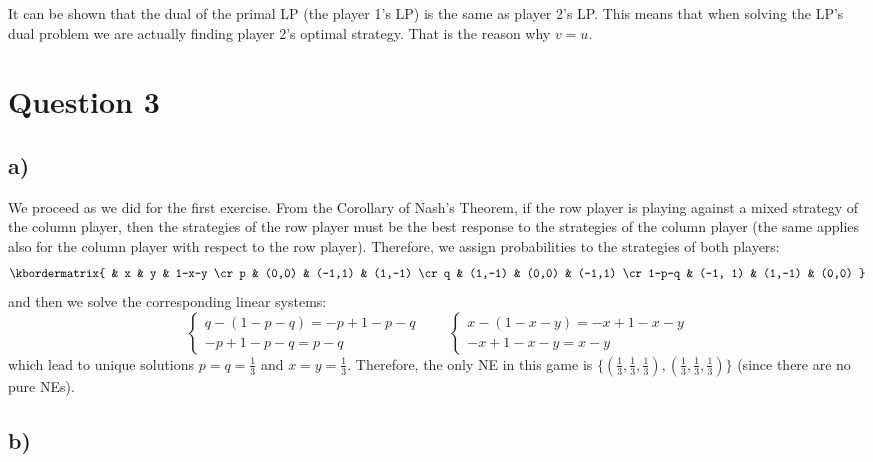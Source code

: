 \documentclass[11pt,a4paper]{article}
\begin{document}
It can be shown that the dual of the primal LP (the player 1's LP) is the same as
player 2's LP. This means that when solving the LP's dual problem we are
actually finding player 2's optimal strategy. That is the reason why $v=u$.
\newpage

\section{Question 3}

\subsection{a)}
We proceed as we did for the first exercise. From the Corollary of Nash's Theorem, if the row player is playing
against a mixed strategy of the column player, then the strategies of the row player must be
the best response to the strategies of the column player (the same applies also for the
column player with respect to the row player). Therefore, we assign probabilities to the strategies of both players:
\begin{equation*}
\kbordermatrix{
& x & y & 1-x-y \cr
p & (0,0) & (-1,1) & (1,-1) \cr
q & (1,-1) & (0,0) & (-1,1) \cr
1-p-q & (-1, 1) & (1,-1) & (0,0)
}
\end{equation*}
and then we solve the corresponding linear systems:
\begin{equation*}
\begin{cases}
q-(1-p-q) = -p +1 -p -q\\
-p +1 -p-q = p-q
\end{cases}
\qquad
\begin{cases}
x-(1-x-y) = -x +1 -x -y\\
-x +1 -x-y = x-y
\end{cases}
\end{equation*}
which lead to unique solutions $p=q=\frac{1}{3}$ and $x=y=\frac{1}{3}$. Therefore, the only NE in this
game is $\{(\frac{1}{3},\frac{1}{3},\frac{1}{3}),(\frac{1}{3},\frac{1}{3},\frac{1}{3})\}$ (since there 
are no pure NEs).

\subsection{b)}

\newpage
\end{document}
